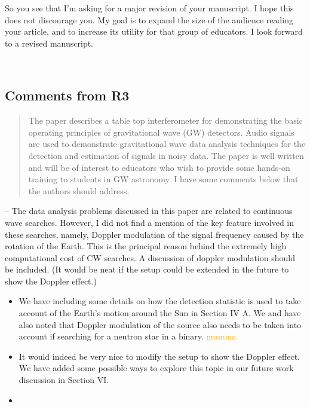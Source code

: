 \documentclass{article}
\newcommand{\han}{\textcolor{orange}}
\begin{document}
\noindent So you see that I'm asking for a major revision of your manuscript.  I hope this does not discourage you.  My goal is to expand the size of the audience reading your article, and to increase its utility for that group of educators.  I look forward to a revised manuscript.

\hspace{1em}\vspace{2em}\\

\subsection*{Comments from R3}

\begin{quote}
The paper describes a table top interferometer for demonstrating the basic operating principles of gravitational wave (GW) detectors. Audio signals are used to demonstrate gravitational wave data analysis techniques for the detection and estimation of signals in noisy data. The paper is well written and will be of interest to educators who wish to provide some hands-on training to students in GW astronomy. I have some comments below that the authors should address.
\end{quote}

\noindent 
-- The data analysis problems discussed in this paper are related to continuous wave searches. However, I did not find a mention of the key feature involved in these searches, namely, Doppler modulation of the signal frequency caused by the rotation of the Earth. This is the principal reason behind the extremely high computational cost of CW searches. A discussion of doppler modulation should be included. (It would be neat if the setup could be extended in the future to show the Doppler effect.)
\begin{itemize}
\item We have including some details on how the detection statistic is used to take account of the Earth's motion around the Sun in Section IV A. We and have also noted that Doppler modulation of the source also needs to be taken into account if searching for a neutron star in a binary. \han{gramma}
\item It would indeed be very nice to modify the setup to show the Doppler effect. We have added some possible ways to explore this topic in our future work discussion in Section VI. 
\item[]
\end{itemize}
\end{document}
